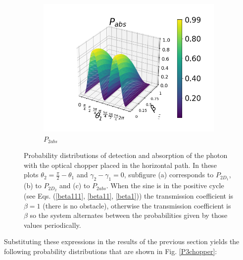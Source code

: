\documentclass[12pt]{book}
\begin{document}
\begin{figure}[t!]
\begin{subfigure}[b]{0.4\linewidth}
\includegraphics[width=\linewidth]{images/PAbs_v.png}
\caption{$P_{2abs}$}
\label{fig:BS1}
\end{subfigure}
\caption{Probability distributions of detection and absorption of the photon with the optical chopper placed in the horizontal path. In these plots $\theta_{2}=\frac{\pi}{2}-\theta_{1}$ and $\gamma_{2}-\gamma_{1}=0$, subfigure (a) corresponds to $P_{2D_{1}}$, (b) to $P_{2D_{2}}$ and (c) to $P_{2abs}$. When the sine is in the positive cycle (see Eqs. (\ref{beta111}, \ref{beta11}, \ref{beta1})) the transmission coefficient is $\beta=1$ (there is no obstacle), otherwise the transmission coefficient is $\beta$ so the system alternates between the probabilities given by those values periodically.}
\label{P4chopper}
\end{figure}

Substituting these expressions in the results of the previous section yields the following probability distributions that are shown in Fig. \ref{P3chopper}:
\end{document}
